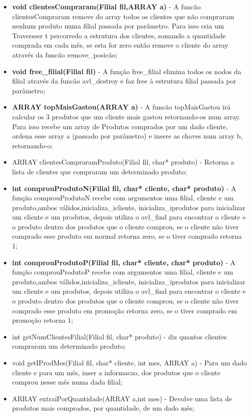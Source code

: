 \begin{itemize}
\item	\textbf{void clientesCompraram(Filial fil,ARRAY a)} - A funcão clientesCompraram remove do array todos os clientes que não compraram nenhum produto numa filial passada por parâmetro. Para isso cria um Traversser t percorredo a estrutura dos clientes, somando a quantidade comprada em cada mês, se esta for zero então remove o cliente do array através da funcão remove\_posicão; 
\item	\textbf{void free\_filial(Filial fil)} - A função free\_filial elimina todos os nodos da filial através da funcão avl\_destroy e faz  free à estrutura filial passada por parâmetro; 
\item	\textbf{ARRAY topMaisGastou(ARRAY a)} - A funcão topMaisGastou irá calcular os 3 produtos que um cliente mais gastou retornando-os num array. Para isso recebe um array de Produtos comprados por um dado cliente, ordena esse array a (passado por parâmetro) e insere as chaves num array b, retornando-o; 
\item	ARRAY clientesCompraramProduto(Filial fil, char* produto) - Retorna a lista de clientes que compraram um determinado produto; 

\item	\textbf{int comprouProdutoN(Filial fil, char* cliente, char* produto)} - A função comprouProdutoN recebe com argumentos uma filial, cliente e um produto,ambos válidos,inicializa\_icliente, inicializa\_iprodutos para inicializar um cliente e um produtos, depois utiliza o avl\_find para encontrar o cliente e o produto dentro dos produtos que o cliente comprou, se o cliente não tiver comprado esse produto em normal retorna zero, se o tiver comprado retorna 1; 

\item	\textbf{int comprouProdutoP(Filial fil, char* cliente, char* produto)} - A função comprouProdutoP recebe com argumentos uma filial, cliente e um produto,ambos válidos,inicializa\_icliente, inicializa\_iprodutos para inicializar um cliente e um produtos, depois utiliza o avl\_find para encontrar o cliente  e o produto dentro dos produtos que o cliente comprou, se o cliente não tiver comprado esse produto em promoção retorna zero, se o tiver comprado em promoção retorna 1;

\item	int getNumClientesFilial(Filial fil, char* produto) - diz quantos clientes compraram um determinado produto; 

\item	void getIProdMes(Filial fil, char* cliente, int mes, ARRAY a) - Para um dado cliente e para um mês, inser a informacao, dos produtos que o cliente comprou nesse mês numa dada filial; 
\item	ARRAY extraiPorQuantidade(ARRAY a,int mes) - Devolve uma lista de produtos mais comprados, por quantidade, de um dado mês; 



\end{itemize}
